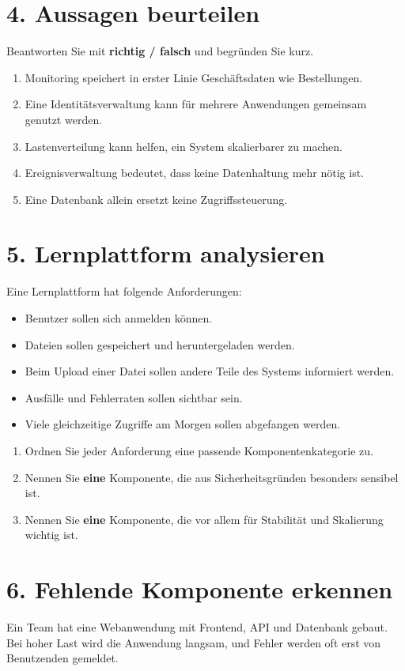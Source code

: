 \documentclass[11pt,a4paper]{article}
\begin{document}
\section*{4. Aussagen beurteilen}
Beantworten Sie mit \textbf{richtig / falsch} und begründen Sie kurz.

\begin{enumerate}
  \item Monitoring speichert in erster Linie Geschäftsdaten wie Bestellungen.
  \item Eine Identitätsverwaltung kann für mehrere Anwendungen gemeinsam genutzt werden.
  \item Lastenverteilung kann helfen, ein System skalierbarer zu machen.
  \item Ereignisverwaltung bedeutet, dass keine Datenhaltung mehr nötig ist.
  \item Eine Datenbank allein ersetzt keine Zugriffssteuerung.
\end{enumerate}

\section*{5. Lernplattform analysieren}
Eine Lernplattform hat folgende Anforderungen:
\begin{itemize}
  \item Benutzer sollen sich anmelden können.
  \item Dateien sollen gespeichert und heruntergeladen werden.
  \item Beim Upload einer Datei sollen andere Teile des Systems informiert werden.
  \item Ausfälle und Fehlerraten sollen sichtbar sein.
  \item Viele gleichzeitige Zugriffe am Morgen sollen abgefangen werden.
\end{itemize}

\begin{enumerate}
  \item Ordnen Sie jeder Anforderung eine passende Komponentenkategorie zu.
  \item Nennen Sie \textbf{eine} Komponente, die aus Sicherheitsgründen besonders sensibel ist.
  \item Nennen Sie \textbf{eine} Komponente, die vor allem für Stabilität und Skalierung wichtig ist.
\end{enumerate}

\section*{6. Fehlende Komponente erkennen}
Ein Team hat eine Webanwendung mit Frontend, API und Datenbank gebaut.
Bei hoher Last wird die Anwendung langsam, und Fehler werden oft erst von Benutzenden gemeldet.
\end{document}
